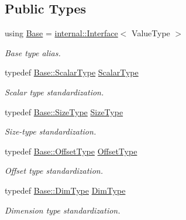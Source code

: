 \subsection*{Public Types}
\begin{DoxyCompactItemize}
\item 
using \hyperlink{classffnn_1_1layer_1_1_receptive_volume_a99a6c14984f9d1cc731f1b1b6e00fb2c}{Base} = \hyperlink{classffnn_1_1layer_1_1internal_1_1_interface}{internal\-::\-Interface}$<$ Value\-Type $>$
\begin{DoxyCompactList}\small\item\em Base type alias. \end{DoxyCompactList}\item 
typedef \hyperlink{classffnn_1_1layer_1_1internal_1_1_interface_a7f834e3365e5199bcbcd16d9abd63941}{Base\-::\-Scalar\-Type} \hyperlink{classffnn_1_1layer_1_1_receptive_volume_a4b3e846caf0136f173b3e0ceff912eac}{Scalar\-Type}
\begin{DoxyCompactList}\small\item\em Scalar type standardization. \end{DoxyCompactList}\item 
typedef \hyperlink{classffnn_1_1layer_1_1internal_1_1_interface_af0567642f60c65b5e87067226a54174b}{Base\-::\-Size\-Type} \hyperlink{classffnn_1_1layer_1_1_receptive_volume_a3e9853931ec53fae609bb3fef11fa325}{Size\-Type}
\begin{DoxyCompactList}\small\item\em Size-\/type standardization. \end{DoxyCompactList}\item 
typedef \hyperlink{classffnn_1_1layer_1_1internal_1_1_interface_adc5bb454329ebd51ac26579a43c006fd}{Base\-::\-Offset\-Type} \hyperlink{classffnn_1_1layer_1_1_receptive_volume_a1844c5ef59193938758e778eb0530ba6}{Offset\-Type}
\begin{DoxyCompactList}\small\item\em Offset type standardization. \end{DoxyCompactList}\item 
typedef \hyperlink{classffnn_1_1layer_1_1internal_1_1_interface_a8d121d0103f254b51e48f7b20a17681f}{Base\-::\-Dim\-Type} \hyperlink{classffnn_1_1layer_1_1_receptive_volume_ab0bd7607040aa08bf9cdfcc30e2794ef}{Dim\-Type}
\begin{DoxyCompactList}\small\item\em Dimension type standardization. \end{DoxyCompactList}\item 

\end{DoxyCompactItemize}
